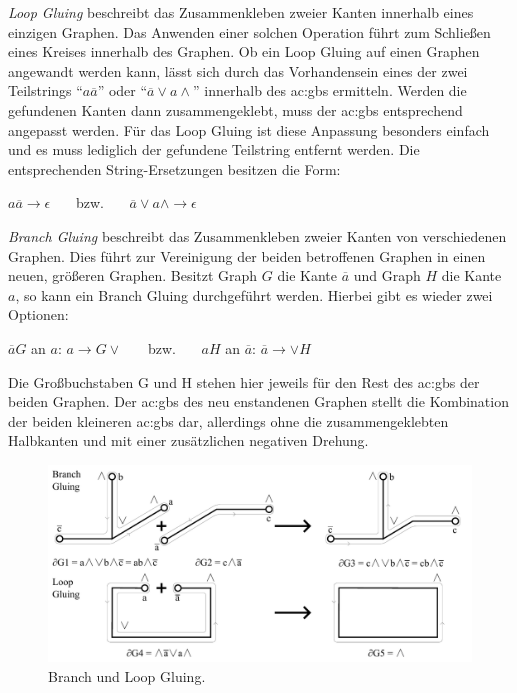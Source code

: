 \textit{Loop Gluing} beschreibt das Zusammenkleben zweier Kanten innerhalb eines einzigen Graphen. Das Anwenden einer solchen Operation
führt zum Schließen eines Kreises innerhalb des Graphen. Ob ein Loop Gluing auf einen Graphen angewandt werden kann, lässt sich durch das
Vorhandensein eines der zwei Teilstrings ``\(a \overline{a}\)'' oder ``\(\overline{a}\vee a\wedge\)'' innerhalb des \gls{ac:gbs} ermitteln. Werden
die gefundenen Kanten dann zusammengeklebt, muss der \gls{ac:gbs} entsprechend angepasst werden. Für das Loop Gluing ist diese Anpassung
besonders einfach und es muss lediglich der gefundene Teilstring entfernt werden. Die entsprechenden String-Ersetzungen besitzen die Form:

\begin{center}
    \(a \overline{a} \longrightarrow \epsilon\) \ \ \ bzw. \ \ \ \(\overline{a}\vee a\wedge \longrightarrow \epsilon\) 
\end{center}

\textit{Branch Gluing} beschreibt das Zusammenkleben zweier Kanten von verschiedenen Graphen. Dies führt zur Vereinigung der beiden betroffenen
Graphen in einen neuen, größeren Graphen. Besitzt Graph \(G\) die Kante \(\overline{a}\) und Graph \(H\) die Kante \(a\), so kann ein Branch Gluing
durchgeführt werden. Hierbei gibt es wieder zwei Optionen:

\begin{center}
    \(\overline{a}G\) an \(a\): \(a \longrightarrow G \vee\) \ \ \ bzw. \ \ \ \(a H\) an \(\overline{a}\): \(\overline{a} \longrightarrow \vee H\)
\end{center}

Die Großbuchstaben G und H stehen hier jeweils für den Rest des \gls{ac:gbs} der beiden Graphen. Der \gls{ac:gbs} des neu enstandenen Graphen
stellt die Kombination der beiden kleineren \gls{ac:gbs} dar, allerdings ohne die zusammengeklebten Halbkanten und mit einer zusätzlichen
negativen Drehung.

\begin{figure}[t]
    \centering
    \includegraphics[width=(\imgWidth)]{images/gluing.pdf}
    \caption{Branch und Loop Gluing.}
    \label{fig:gluing}
\end{figure}

